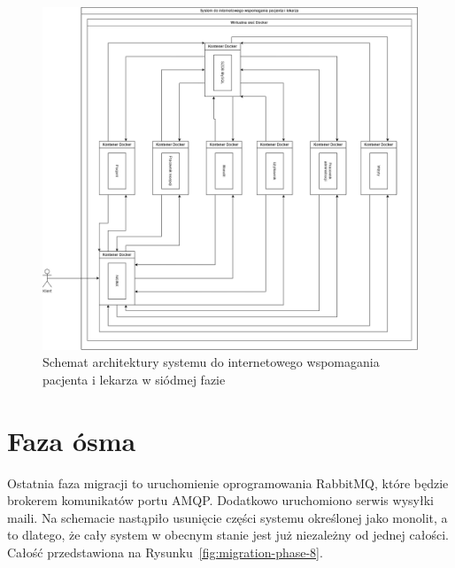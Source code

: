 \documentclass[12pt,twoside]{book}
\newcommand{\captionvspace}{\vspace{6pt}}
\begin{document}
\begin{figure}[ht]
\centering
\includegraphics[width=\textwidth]{includes/images/migration-phase-7.png}
\captionvspace
\caption{Schemat architektury systemu do internetowego wspomagania pacjenta i lekarza w siódmej fazie}
\label{fig:migration-phase-7}
\end{figure}

\section{Faza ósma}
Ostatnia faza migracji to uruchomienie oprogramowania RabbitMQ, które będzie brokerem komunikatów portu AMQP. Dodatkowo uruchomiono serwis wysyłki maili. Na schemacie nastąpiło usunięcie części systemu określonej jako monolit, a to dlatego, że cały system w obecnym stanie jest już niezależny od jednej całości. Całość przedstawiona na Rysunku~\ref{fig:migration-phase-8}.
\end{document}
